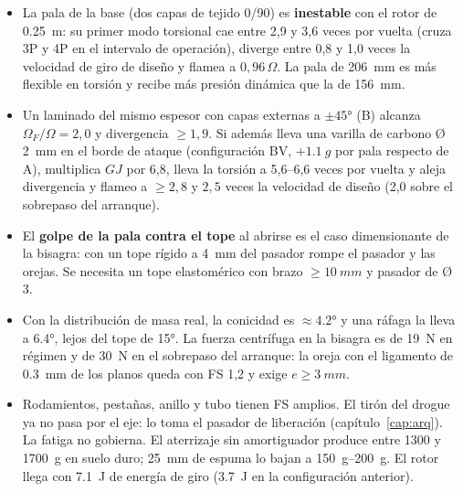 \begin{resultado}
\begin{itemize}[leftmargin=*]
  \item La pala de la base (dos capas de tejido 0/90) es \textbf{inestable} con el rotor de
        \SI{0.25}{m}: su primer modo torsional cae entre 2,9 y 3,6 veces por vuelta (cruza 3P y
        4P en el intervalo de operación), diverge entre 0,8 y 1,0 veces la velocidad de
        giro de diseño y flamea a $0{,}96\,\Omega$. La pala de \SI{206}{mm} es más
        flexible en torsión y recibe más presión dinámica que la de \SI{156}{mm}.
  \item Un laminado del mismo espesor con capas externas a $\pm\ang{45}$ (B) alcanza
        $\Omega_F/\Omega=2{,}0$ y divergencia $\ge1{,}9$. Si además lleva una varilla de
        carbono Ø\,\SI{2}{mm} en el borde de ataque (configuración BV, $+\SI{1.1}{g}$ por
        pala respecto de A), multiplica $GJ$ por 6,8, lleva la torsión a 5,6--6,6 veces por vuelta y
        aleja divergencia y flameo a $\ge2{,}8$ y $2{,}5$ veces la velocidad de diseño
        (2,0 sobre el sobrepaso del arranque).
  \item El \textbf{golpe de la pala contra el tope} al abrirse es el caso dimensionante de
        la bisagra: con un tope rígido a \SI{4}{mm} del pasador rompe el pasador y las
        orejas. Se necesita un tope elastomérico con brazo $\ge\SI{10}{mm}$ y pasador de Ø\,3.
  \item Con la distribución de masa real, la conicidad es $\approx\ang{4.2}$ y una ráfaga
        la lleva a \ang{6.4}, lejos del tope de \ang{+15}. La fuerza centrífuga en la
        bisagra es de \SI{19}{N} en régimen y de \SI{30}{N} en el sobrepaso del arranque: la
        oreja con el ligamento de \SI{0.3}{mm} de los planos queda con FS 1,2 y exige
        $e\ge\SI{3}{mm}$.
  \item Rodamientos, pestañas, anillo y tubo tienen FS amplios. El tirón del drogue ya no
        pasa por el eje: lo toma el pasador de liberación (capítulo~\ref{cap:arq}). La fatiga
        no gobierna. El aterrizaje sin amortiguador produce entre \num{1300} y \SI{1700}{g}
        en suelo duro; \SI{25}{mm} de espuma lo bajan a \SIrange{150}{200}{g}. El rotor
        llega con \SI{7.1}{J} de energía de giro (\SI{3.7}{J} en la configuración anterior).
\end{itemize}
\end{resultado}

